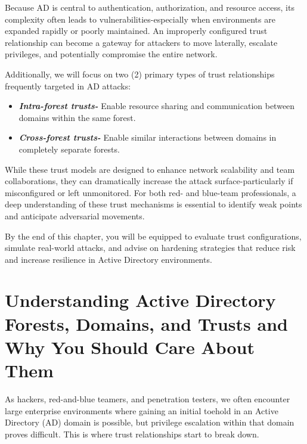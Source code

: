 Because AD is central to authentication, authorization, and resource access, its complexity often leads to vulnerabilities-especially when environments are expanded rapidly or poorly maintained. An improperly configured trust relationship can become a gateway for attackers to move laterally, escalate privileges, and potentially compromise the entire network.


Additionally, we will focus on two (2) primary types of trust relationships frequently targeted in AD attacks:

\begin{itemize}
    \item \textbf{\textit{Intra-forest trusts-}} Enable resource sharing and communication between domains within the same forest.
    \item \textbf{\textit{Cross-forest trusts-}} Enable similar interactions between domains in completely separate forests.
\end{itemize}

While these trust models are designed to enhance network scalability and team collaborations, they can dramatically increase the attack surface-particularly if misconfigured or left unmonitored. For both red- and blue-team professionals, a deep understanding of these trust mechanisms is essential to identify weak points and anticipate adversarial movements.

By the end of this chapter, you will be equipped to evaluate trust configurations, simulate real-world attacks, and advise on hardening strategies that reduce risk and increase resilience in Active Directory environments.

\section{Understanding Active Directory Forests, Domains, and Trusts and Why You Should Care About Them}
As hackers, red-and-blue teamers, and penetration testers, we often encounter large enterprise environments where gaining an initial toehold in an Active Directory (AD) domain is possible, but privilege escalation within that domain proves difficult. This is where trust relationships start to break down.

